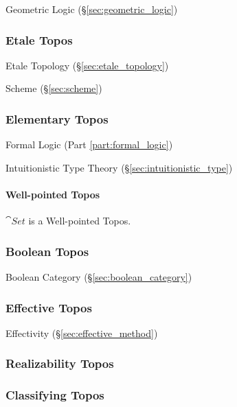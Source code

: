 Geometric Logic (\S\ref{sec:geometric_logic})



\subsubsection{Etale Topos}\label{sec:etale_topos}

Etale Topology (\S\ref{sec:etale_topology})

Scheme (\S\ref{sec:scheme})



\subsubsection{Elementary Topos}\label{sec:elementary_topos}

Formal Logic (Part \ref{part:formal_logic})

Intuitionistic Type Theory (\S\ref{sec:intuitionistic_type})



\paragraph{Well-pointed Topos}\label{sec:wellpointed_topos}\hfill

$\cat{Set}$ is a Well-pointed Topos.



\subsubsection{Boolean Topos}\label{sec:boolean_topos}

Boolean Category (\S\ref{sec:boolean_category})



\subsubsection{Effective Topos}\label{sec:effective_topos}

Effectivity (\S\ref{sec:effective_method})



\subsubsection{Realizability Topos}\label{sec:realizability_topos}

\subsubsection{Classifying Topos}\label{sec:classifying_topos}

